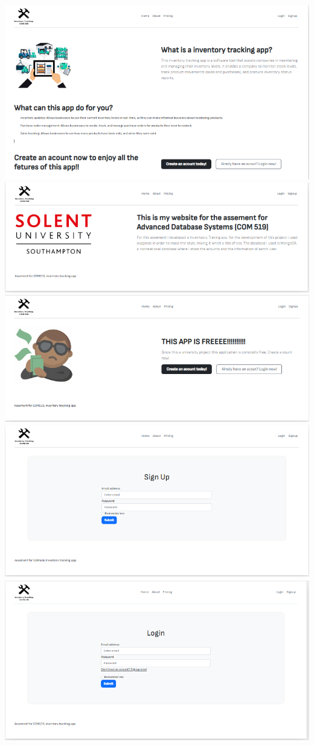 \includegraphics{./images/home_logo.png}
\includegraphics{./images/about.PNG}
\includegraphics{./images/pricing.PNG}
\includegraphics{./images/sing_up.PNG}
\includegraphics{./images/Login.PNG}
